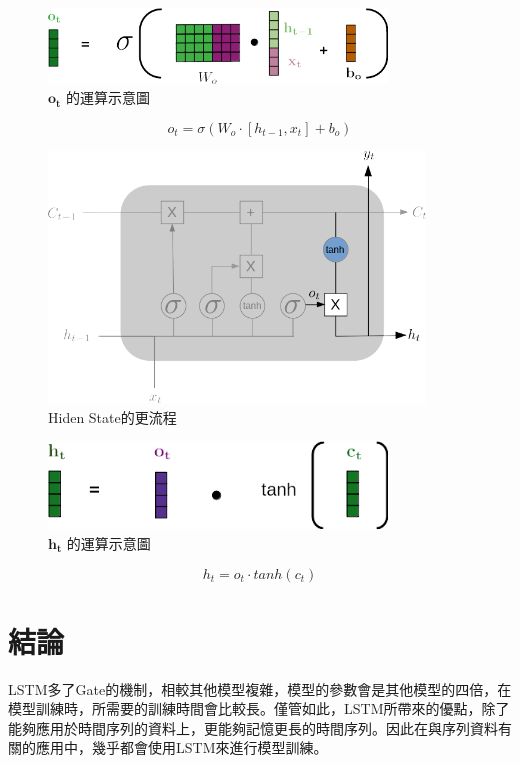 \begin{figure}[H]
	\centering
	\includegraphics[width=9cm]{./pic/bcjXoMZk.png}
	\caption{\(\mathbf{o_t}\) 的運算示意圖}
	\label{fig:OutputGateCalculate}
\end{figure}

\begin{equation}
	\label{eqn:OutputGateCalculate}
	o_t = \sigma(W_o\cdot[h_{t-1},x_t]+b_o)
\end{equation}

\begin{figure}[H]
	\centering
	\includegraphics[width=10cm]{./pic/evwQIqAz.png}
	\caption{Hiden State的更流程}
	\label{fig:HidenStateUpdate}
\end{figure}


\begin{figure}[H]
	\centering
	\includegraphics[width=9cm]{./pic/vo6a2bAS.png}
	\caption{\(\mathbf{h_t}\) 的運算示意圖}
	\label{fig:HidenStateUpdateCaculate}
\end{figure}


\begin{equation}
	\label{eqn:InputCalculate}
	h_t = o_t \cdot tanh(c_t) 
\end{equation}



\section {結論}

LSTM多了Gate的機制，相較其他模型複雜，模型的參數會是其他模型的四倍，在模型訓練時，所需要的訓練時間會比較長。僅管如此，LSTM所帶來的優點，除了能夠應用於時間序列的資料上，更能夠記憶更長的時間序列。因此在與序列資料有關的應用中，幾乎都會使用LSTM來進行模型訓練。




